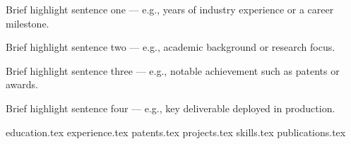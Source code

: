 \documentclass[11pt, a4paper]{awesome-cv}
\newcommand*{\sectiondir}{resume/}
\begin{document}
\makecvheader

\begin{highlights}
  \item[\textbullet]{Brief highlight sentence one — e.g., years of industry experience or a career milestone.}
  \item[\textbullet]{Brief highlight sentence two — e.g., academic background or research focus.}
  \item[\textbullet]{Brief highlight sentence three — e.g., notable achievement such as patents or awards.}
  \item[\textbullet]{Brief highlight sentence four — e.g., key deliverable deployed in production.}
\end{highlights}
{education.tex}
{experience.tex}
\newpage
{patents.tex}
{projects.tex}
{skills.tex}
\newpage
{publications.tex}
\end{document}
